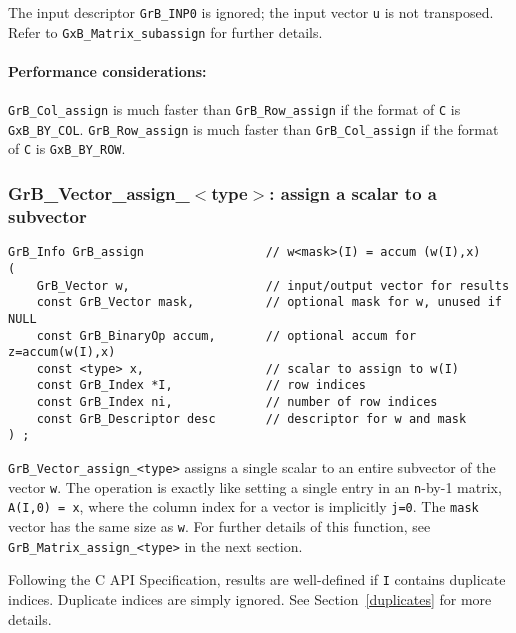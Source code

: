 \documentclass[12pt]{article}
\begin{document}
The input descriptor \verb'GrB_INP0' is ignored; the input vector \verb'u' is
not transposed.  Refer to \verb'GxB_Matrix_subassign' for further details.

\paragraph{\bf Performance considerations:} %
\verb'GrB_Col_assign' is much faster than \verb'GrB_Row_assign' if the format
of \verb'C' is \verb'GxB_BY_COL'.  \verb'GrB_Row_assign' is much faster than
\verb'GrB_Col_assign' if the format of \verb'C' is \verb'GxB_BY_ROW'.

\newpage
\subsubsection{{\sf GrB\_Vector\_assign\_$<$type$>$:} assign a scalar to a subvector}
\label{assign_vector_scalar}

\begin{mdframed}[userdefinedwidth=6in]
{\footnotesize
\begin{verbatim}
GrB_Info GrB_assign                 // w<mask>(I) = accum (w(I),x)
(
    GrB_Vector w,                   // input/output vector for results
    const GrB_Vector mask,          // optional mask for w, unused if NULL
    const GrB_BinaryOp accum,       // optional accum for z=accum(w(I),x)
    const <type> x,                 // scalar to assign to w(I)
    const GrB_Index *I,             // row indices
    const GrB_Index ni,             // number of row indices
    const GrB_Descriptor desc       // descriptor for w and mask
) ;
\end{verbatim} } \end{mdframed}

\verb'GrB_Vector_assign_<type>' assigns a single scalar to an entire subvector
of the vector \verb'w'.  The operation is exactly like setting a single entry
in an \verb'n'-by-1 matrix, \verb'A(I,0) = x', where the column index for a
vector is implicitly \verb'j=0'.  The \verb'mask' vector has the same size as
\verb'w'.  For further details of this function, see
\verb'GrB_Matrix_assign_<type>' in the next section.

Following the C API Specification, results are well-defined if \verb'I'
contains duplicate indices.  Duplicate indices are simply ignored.  See
Section~\ref{duplicates} for more details.
\end{document}
